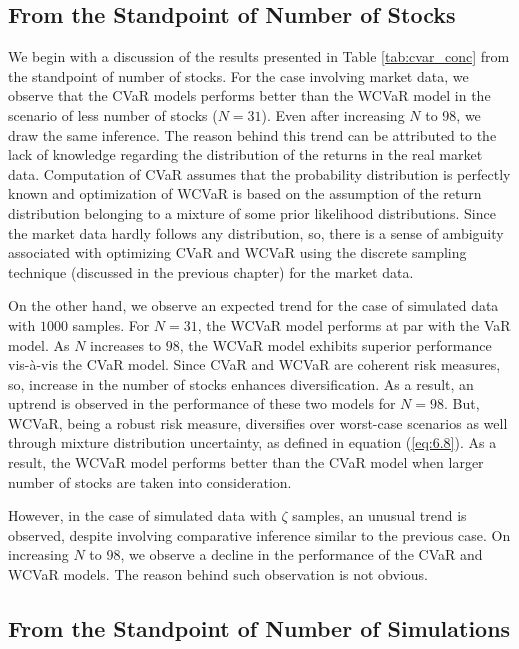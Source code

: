 \subsection{From the Standpoint of Number of Stocks}

We begin with a discussion of the results presented in Table \ref{tab:cvar_conc} from the standpoint of number of stocks. For the case involving market data, we observe that the CVaR models performs better than the WCVaR model in the scenario of less number of stocks ($N=31$). Even after increasing $N$ to 98, we draw the same inference. The reason behind this trend can be attributed to the lack of knowledge regarding the distribution of the returns in the real market data. Computation of CVaR assumes that the probability distribution is perfectly known and optimization of WCVaR is based on the assumption of the return distribution belonging to a mixture of some prior likelihood distributions. Since the market data hardly follows any distribution, so, there is a sense of ambiguity associated with optimizing CVaR and WCVaR using the discrete sampling technique (discussed in the previous chapter) for the market data. 

On the other hand, we observe an expected trend for the case of simulated data with $1000$ samples. For $N=31$, the WCVaR model performs at par with the VaR model. As $N$ increases to $98$, the WCVaR model exhibits superior performance vis-\`a-vis the CVaR model. Since CVaR and WCVaR are coherent risk measures, so, increase in the number of stocks enhances diversification. As a result, an uptrend is observed in the performance of these two models for $N=98$. But, WCVaR, being a robust risk measure, diversifies over worst-case scenarios as well through mixture distribution uncertainty, as defined in equation (\ref{eq:6.8}). As a result, the WCVaR model performs better than the CVaR model when larger number of stocks are taken into consideration.

However, in the case of simulated data with $\zeta$ samples, an unusual trend is observed, despite involving comparative inference similar to the previous case. On increasing $N$ to 98, we observe a decline in the performance of the CVaR and WCVaR models. The reason behind such observation is not obvious.





\subsection{From the Standpoint of Number of Simulations}

